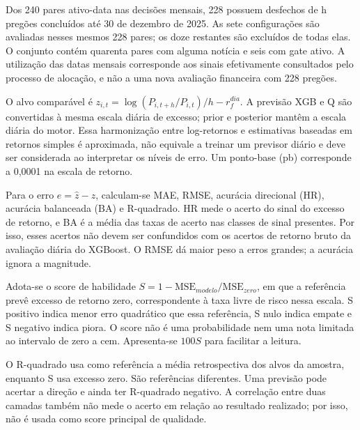 Dos 240 pares ativo-data nas decisões mensais, 228 possuem desfechos de h pregões concluídos até 30 de dezembro de 2025. As sete configurações são avaliadas nesses mesmos 228 pares; os doze restantes são excluídos de todas elas. O conjunto contém quarenta pares com alguma notícia e seis com gate ativo. A utilização das datas mensais corresponde aos sinais efetivamente consultados pelo processo de alocação, e não a uma nova avaliação financeira com 228 pregões.

O alvo comparável é $z_{i,t}=\log(P_{i,t+h}/P_{i,t})/h-r_f^{dia}$. A previsão XGB e Q são convertidas à mesma escala diária de excesso; prior e posterior mantêm a escala diária do motor. Essa harmonização entre log-retornos e estimativas baseadas em retornos simples é aproximada, não equivale a treinar um previsor diário e deve ser considerada ao interpretar os níveis de erro. Um ponto-base (pb) corresponde a 0,0001 na escala de retorno.

Para o erro $e=\widehat z-z$, calculam-se MAE, RMSE, acurácia direcional (HR), acurácia balanceada (BA) e R-quadrado. HR mede o acerto do sinal do excesso de retorno, e BA é a média das taxas de acerto nas classes de sinal presentes. Por isso, esses acertos não devem ser confundidos com os acertos de retorno bruto da avaliação diária do XGBoost. O RMSE dá maior peso a erros grandes; a acurácia ignora a magnitude.

Adota-se o score de habilidade $S=1-\mathrm{MSE}_{modelo}/\mathrm{MSE}_{zero}$, em que a referência prevê excesso de retorno zero, correspondente à taxa livre de risco nessa escala. S positivo indica menor erro quadrático que essa referência, S nulo indica empate e S negativo indica piora. O score não é uma probabilidade nem uma nota limitada ao intervalo de zero a cem. Apresenta-se $100S$ para facilitar a leitura.

O R-quadrado usa como referência a média retrospectiva dos alvos da amostra, enquanto S usa excesso zero. São referências diferentes. Uma previsão pode acertar a direção e ainda ter R-quadrado negativo. A correlação entre duas camadas também não mede o acerto em relação ao resultado realizado; por isso, não é usada como score principal de qualidade.

